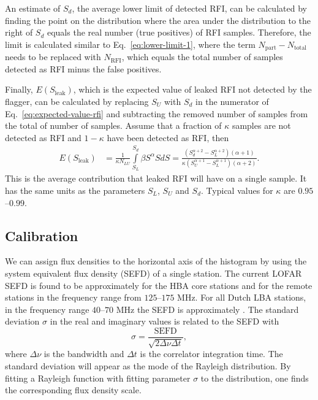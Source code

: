 \documentclass[useAMS,usenatbib]{mn2e}
\newcommand{\editmark}[1]{{\color{red}{\textbf{#1}}}}
\begin{document}
An estimate of $S_d$, the average lower limit of detected RFI, can be calculated by finding the point on the distribution where the area under the distribution to the right of $S_d$ equals the real number (true positives) of RFI samples. Therefore, the limit is calculated similar to Eq.~\eqref{eq:lower-limit-1}, where the term $N_\textrm{part} - N_\textrm{total}$ needs to be replaced with $N_\textrm{RFI}$, which equals the total number of samples detected as RFI minus the false positives.

Finally, $E(S_\textrm{leak})$, which is the expected value of leaked RFI not detected by the flagger, can be calculated by replacing $S_U$ with $S_d$ in the numerator of Eq.~\eqref{eq:expected-value-rfi} and subtracting the removed number of samples from the total of number of samples. Assume that a fraction of $\kappa$ samples are not detected as RFI and $1-\kappa$ have been detected as RFI, then
\begin{align} \label{eq:expected-value-leaked-rfi}
E(S_\textrm{leak}) & = \frac{1}{\kappa N_{LU}}\int\limits_{S_L}^{S_d} \beta S^\alpha S dS
= \frac{\left( S_d^{\alpha+2} - S_L^{\alpha+2} \right) \left( \alpha+1 \right) } {\kappa \left( S_U^{\alpha+1} - S_L^{\alpha+1}\right) \left( \alpha+2 \right)}.
\end{align}
This is the average contribution that leaked RFI will have on a single sample. It has the same units as the parameters $S_L$, $S_U$ and $S_d$. Typical values for $\kappa$ are $0.95$--$0.99$.

\subsection{Calibration} \label{sec:calibration}
We can assign flux densities to the horizontal axis of the histogram by using the system equivalent flux density (SEFD) of a single station. The current LOFAR SEFD is found to be approximately \editmark{3400~Jy} for the HBA core stations and \editmark{1700~Jy} for the remote stations in the frequency range from $125$--$175$ MHz. For all Dutch LBA stations, in the frequency range $40$--$70$ MHz the SEFD is approximately \editmark{34,000~Jy}. The standard deviation $\sigma$ in the real and imaginary values is related to the SEFD with %
\begin{equation}
 \sigma = \frac{\textrm{SEFD}}{\sqrt{2 \Delta \nu \Delta t}},
\end{equation}
where $\Delta \nu$ is the bandwidth and $\Delta t$ is the correlator integration time. The standard deviation will appear as the mode of the Rayleigh distribution. By fitting a Rayleigh function with fitting parameter $\sigma$ to the distribution, one finds the corresponding flux density scale.
\end{document}

